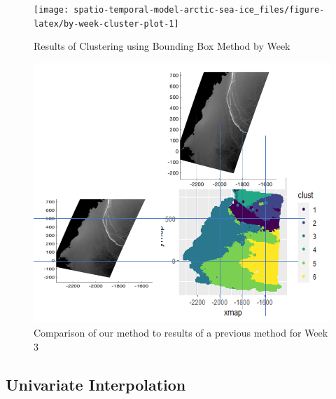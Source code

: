 \documentclass[12pt]{article}
\begin{document}
\begin{figure}[tbp]

{\centering \texttt{[image: spatio-temporal-model-arctic-sea-ice\_files/figure-latex/by-week-cluster-plot-1]} 

}

\caption{Results of Clustering using Bounding Box Method by Week}\label{fig:by-week-cluster-plot}
\end{figure}

\begin{figure}[tbp]

{\centering \includegraphics[width=0.8\linewidth,]{images/week-comp} 

}

\caption{Comparison of our method to results of a previous method for Week 3}\label{fig:week-comp}
\end{figure}

\hypertarget{univariate-interpolation-1}{%
\subsection{Univariate Interpolation}\label{univariate-interpolation-1}}
\end{document}
